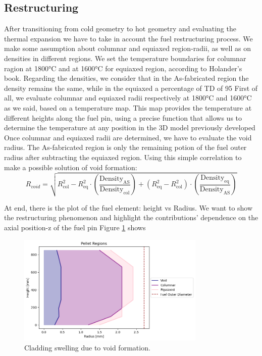 \subsection{Restructuring}
After transitioning from cold geometry to hot geometry and evaluating the thermal expansion we have to take in account the fuel restructuring process.
We make some assumption about columnar and equiaxed region-radii, as well as on densities in different regions. We set the temperature boundaries for columnar ragion at 1800°C and at 1600°C for equiaxed region, according to Holander’s book. Regarding the densities, we consider that in the As-fabricated region the density remains the same, while in the equiaxed a percentage of TD of 95%
First of all, we evaluate columnar and equiaxed radii respectively at 1800°C and 1600°C as we said, based on a temperature map. This map provides the temperature at different heights along the fuel pin, using a precise function that allows us to determine the temperature at any position in the 3D model previously developed
Once  columnar and equiaxed radii are determined, we have to evaluate the void radius. The As-fabricated region is only the remaining potion of the fuel outer radius after subtracting the equiaxed region. Using this simple correlation to make a possible solution of void formation: 
\begin{equation}
R_{void} = \sqrt{
    R_{\text{col}}^2 - R_{\text{eq}}^2 \cdot \left( \frac{\text{Density}_{\text{AS}}}{\text{Density}_{\text{col}}} \right)
    + \left( R_{\text{eq}}^2 - R_{\text{col}}^2 \right) \cdot \left( \frac{\text{Density}_{\text{eq}}}{\text{Density}_{\text{AS}}} \right)
}
\end{equation}

At end, there is the plot of the fuel element: height vs Radius. We want to show the restructuring phenomenon and highlight the contributions’ dependence on the axial position-z of the fuel pin
Figure \ref{fig:restructuring} shows 

\begin{figure}[H]
\centering
\includegraphics[width=0.8\textwidth]{restructuring.png}
\caption{Cladding swelling due to void formation.}
\label{fig:restructuring}
\end{figure}
